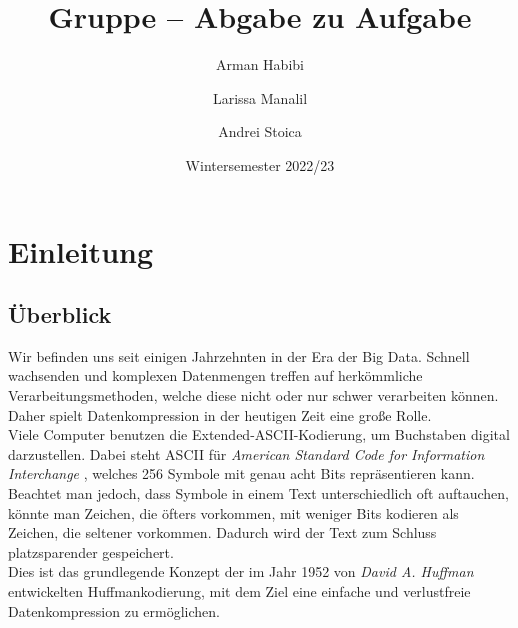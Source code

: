 \documentclass[course=erap]{aspdoc}
\author{Arman Habibi \and Larissa Manalil \and Andrei Stoica}
\date{Wintersemester 2022/23}
\title{Gruppe \theGroup{} -- Abgabe zu Aufgabe \theNumber}
\begin{document}
\maketitle

\section{Einleitung}
\subsection{Überblick}

Wir befinden uns seit einigen Jahrzehnten in der Era der Big Data. Schnell wachsenden und komplexen Datenmengen treffen auf herkömmliche Verarbeitungsmethoden, welche diese nicht oder nur schwer verarbeiten können. Daher spielt Datenkompression in der heutigen Zeit eine große Rolle.\\
Viele Computer benutzen die Extended-ASCII-Kodierung, um Buchstaben digital darzustellen. Dabei steht ASCII für \textit{American Standard Code for Information Interchange} \cite{Ascii}, welches 256 Symbole mit genau acht Bits repräsentieren kann. Beachtet man jedoch, dass Symbole in einem Text unterschiedlich oft auftauchen, könnte man Zeichen, die öfters vorkommen, mit weniger Bits kodieren als Zeichen, die seltener vorkommen. Dadurch wird der Text zum Schluss platzsparender gespeichert.\\
Dies ist das grundlegende Konzept der im Jahr 1952 von \textit{David A. Huffman} entwickelten Huffmankodierung, mit dem Ziel eine einfache und verlustfreie Datenkompression zu ermöglichen.
\end{document}
